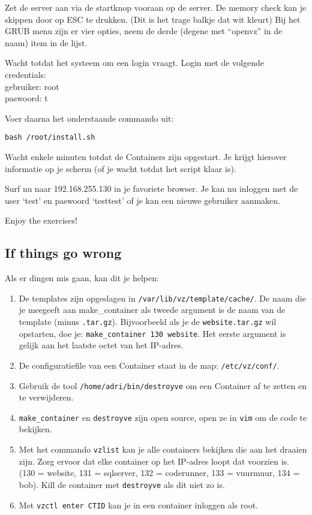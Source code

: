 Zet de server aan via de startknop vooraan op de server. De memory check kan je skippen door op ESC te drukken. (Dit is het trage balkje dat wit kleurt) Bij het GRUB menu zijn er vier opties, neem de derde (degene met ``openvz'' in de naam) item in de lijst. 

Wacht totdat het systeem om een login vraagt. Login met de volgende credentials:\\ 
gebruiker: root\\
paswoord: t

Voer daarna het onderstaande commando uit:
\begin{lstlisting}
bash /root/install.sh
\end{lstlisting}

Wacht enkele minuten totdat de Containers zijn opgestart. Je krijgt hierover informatie op je scherm (of je wacht totdat het script klaar is). 

Surf nu naar 192.168.255.130 in je favoriete browser. 
Je kan nu inloggen met de user `test' en paswoord `testtest' of je kan een nieuwe gebruiker aanmaken.

Enjoy the exercises!

\subsection{If things go wrong}

Als er dingen mis gaan, kan dit je helpen:
\begin{enumerate}
\item De templates zijn opgeslagen in \texttt{/var/lib/vz/template/cache/}. De naam die je meegeeft aan make\_container als tweede argument is de naam van de template (minus \texttt{.tar.gz}). Bijvoorbeeld als je de \texttt{website.tar.gz} wil opstarten, doe je: \texttt{make\_container 130 website}. Het eerste argument is gelijk aan het laatste octet van het IP-adres.
\item De configuratiefile van een Container staat in de map: \texttt{/etc/vz/conf/}.
\item Gebruik de tool \texttt{/home/adri/bin/destroyve} om een Container af te zetten en te verwijderen.
\item \texttt{make\_container} en \texttt{destroyve} zijn open source, open ze in \texttt{vim} om de code te bekijken. 
\item Met het commando \texttt{vzlist} kan je alle containers bekijken die aan het draaien zijn. Zorg ervoor dat elke container op het IP-adres loopt dat voorzien is. (130 = website, 131 = sqlserver, 132 = coderunner, 133 = vuurmuur, 134 = bob). Kill de container met \texttt{destroyve} als dit niet zo is.
\item Met \texttt{vzctl enter CTID} kan je in een container inloggen als root.
\end{enumerate}